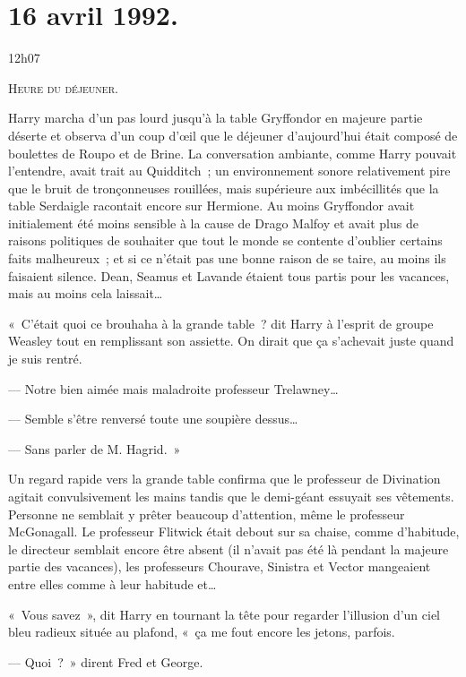 
\section{16 avril 1992.}

12h07

\lettrine{H}{eure du déjeuner.}

\hplettrineextrapara
Harry marcha d'un pas lourd jusqu'à la table Gryffondor en majeure partie déserte et observa d'un coup d'œil que le déjeuner d'aujourd'hui était composé de boulettes de Roupo et de Brine. La conversation ambiante, comme Harry pouvait l'entendre, avait trait au Quidditch~; un environnement sonore relativement pire que le bruit de tronçonneuses rouillées, mais supérieure aux imbécillités que la table Serdaigle racontait encore sur Hermione. Au moins Gryffondor avait initialement été moins sensible à la cause de Drago Malfoy et avait plus de raisons politiques de souhaiter que tout le monde se contente d'oublier certains faits malheureux~; et si ce n'était pas une bonne raison de se taire, au moins ils faisaient silence. Dean, Seamus et Lavande étaient tous partis pour les vacances, mais au moins cela laissait…

«~C'était quoi ce brouhaha à la grande table~? dit Harry à l'esprit de groupe Weasley tout en remplissant son assiette. On dirait que ça s'achevait juste quand je suis rentré.

--- Notre bien aimée mais maladroite professeur Trelawney…

--- Semble s'être renversé toute une soupière dessus…

--- Sans parler de M. Hagrid.~»

Un regard rapide vers la grande table confirma que le professeur de Divination agitait convulsivement les mains tandis que le demi-géant essuyait ses vêtements. Personne ne semblait y prêter beaucoup d'attention, même le professeur McGonagall. Le professeur Flitwick était debout sur sa chaise, comme d'habitude, le directeur semblait encore être absent (il n'avait pas été là pendant la majeure partie des vacances), les professeurs Chourave, Sinistra et Vector mangeaient entre elles comme à leur habitude et…

«~Vous savez~», dit Harry en tournant la tête pour regarder l'illusion d'un ciel bleu radieux située au plafond, «~ça me fout encore les jetons, parfois.

--- Quoi~?~» dirent Fred et George.

